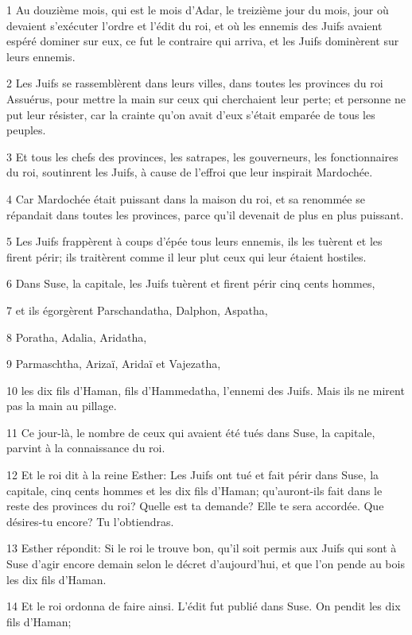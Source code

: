 \par 1 Au douzième mois, qui est le mois d'Adar, le treizième jour du mois, jour où devaient s'exécuter l'ordre et l'édit du roi, et où les ennemis des Juifs avaient espéré dominer sur eux, ce fut le contraire qui arriva, et les Juifs dominèrent sur leurs ennemis.
\par 2 Les Juifs se rassemblèrent dans leurs villes, dans toutes les provinces du roi Assuérus, pour mettre la main sur ceux qui cherchaient leur perte; et personne ne put leur résister, car la crainte qu'on avait d'eux s'était emparée de tous les peuples.
\par 3 Et tous les chefs des provinces, les satrapes, les gouverneurs, les fonctionnaires du roi, soutinrent les Juifs, à cause de l'effroi que leur inspirait Mardochée.
\par 4 Car Mardochée était puissant dans la maison du roi, et sa renommée se répandait dans toutes les provinces, parce qu'il devenait de plus en plus puissant.
\par 5 Les Juifs frappèrent à coups d'épée tous leurs ennemis, ils les tuèrent et les firent périr; ils traitèrent comme il leur plut ceux qui leur étaient hostiles.
\par 6 Dans Suse, la capitale, les Juifs tuèrent et firent périr cinq cents hommes,
\par 7 et ils égorgèrent Parschandatha, Dalphon, Aspatha,
\par 8 Poratha, Adalia, Aridatha,
\par 9 Parmaschtha, Arizaï, Aridaï et Vajezatha,
\par 10 les dix fils d'Haman, fils d'Hammedatha, l'ennemi des Juifs. Mais ils ne mirent pas la main au pillage.
\par 11 Ce jour-là, le nombre de ceux qui avaient été tués dans Suse, la capitale, parvint à la connaissance du roi.
\par 12 Et le roi dit à la reine Esther: Les Juifs ont tué et fait périr dans Suse, la capitale, cinq cents hommes et les dix fils d'Haman; qu'auront-ils fait dans le reste des provinces du roi? Quelle est ta demande? Elle te sera accordée. Que désires-tu encore? Tu l'obtiendras.
\par 13 Esther répondit: Si le roi le trouve bon, qu'il soit permis aux Juifs qui sont à Suse d'agir encore demain selon le décret d'aujourd'hui, et que l'on pende au bois les dix fils d'Haman.
\par 14 Et le roi ordonna de faire ainsi. L'édit fut publié dans Suse. On pendit les dix fils d'Haman;
